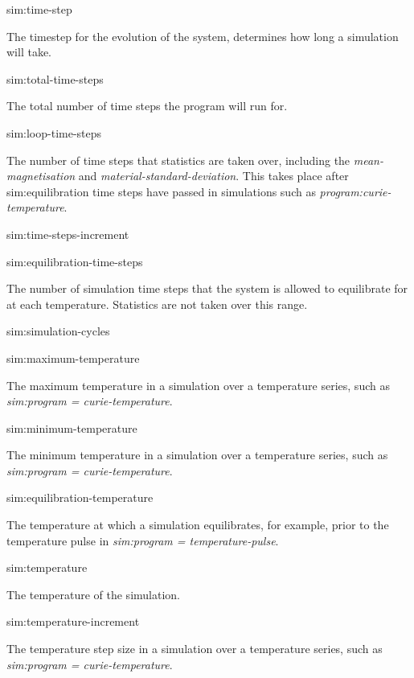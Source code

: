 {\zicf sim:time-step} The timestep for the evolution of the system, determines how long a simulation will take.

{\zicf sim:total-time-steps} The total number of time steps the program will run for.

{\zicf sim:loop-time-steps} The number of time steps that statistics are taken over, including the \textit{mean-magnetisation} and \textit{material-standard-deviation}. This takes place after sim:equilibration time steps have passed in simulations such as \textit{program:curie-temperature}.

{\zicf sim:time-steps-increment}

{\zicf sim:equilibration-time-steps} The number of simulation time steps that the system is allowed to equilibrate for at each temperature. Statistics are not taken over this range.

{\zicf sim:simulation-cycles}

{\zicf sim:maximum-temperature} The maximum temperature in a simulation over a temperature series, such as \textit{sim:program = curie-temperature}.

{\zicf sim:minimum-temperature} The minimum temperature in a simulation over a temperature series, such as \textit{sim:program = curie-temperature}.

{\zicf sim:equilibration-temperature} The temperature at which a simulation equilibrates, for example, prior to the temperature pulse in \textit{sim:program = temperature-pulse}.

{\zicf sim:temperature} The temperature of the simulation.

{\zicf sim:temperature-increment} The temperature step size in a simulation over a temperature series, such as \textit{sim:program = curie-temperature}.

